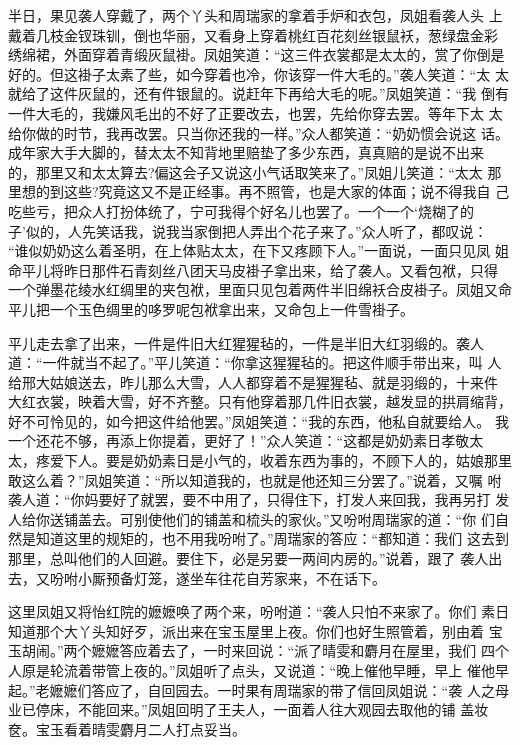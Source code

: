 半日，果见袭人穿戴了，两个丫头和周瑞家的拿着手炉和衣包，凤姐看袭人头
上戴着几枝金钗珠钏，倒也华丽，又看身上穿着桃红百花刻丝银鼠袄，葱绿盘金彩
绣绵裙，外面穿着青缎灰鼠褂。凤姐笑道：“这三件衣裳都是太太的，赏了你倒是
好的。但这褂子太素了些，如今穿着也冷，你该穿一件大毛的。”袭人笑道：“太
太就给了这件灰鼠的，还有件银鼠的。说赶年下再给大毛的呢。”凤姐笑道：“我
倒有一件大毛的，我嫌风毛出的不好了正要改去，也罢，先给你穿去罢。等年下太
太给你做的时节，我再改罢。只当你还我的一样。”众人都笑道：“奶奶惯会说这
话。成年家大手大脚的，替太太不知背地里赔垫了多少东西，真真赔的是说不出来
的，那里又和太太算去?偏这会子又说这小气话取笑来了。”凤姐儿笑道：“太太
那里想的到这些?究竟这又不是正经事。再不照管，也是大家的体面；说不得我自
己吃些亏，把众人打扮体统了，宁可我得个好名儿也罢了。一个一个‘烧糊了的
子’似的，人先笑话我，说我当家倒把人弄出个花子来了。”众人听了，都叹说：
“谁似奶奶这么着圣明，在上体贴太太，在下又疼顾下人。”一面说，一面只见凤
姐命平儿将昨日那件石青刻丝八团天马皮褂子拿出来，给了袭人。又看包袱，只得
一个弹墨花绫水红绸里的夹包袱，里面只见包着两件半旧绵袄合皮褂子。凤姐又命
平儿把一个玉色绸里的哆罗呢包袱拿出来，又命包上一件雪褂子。

平儿走去拿了出来，一件是件旧大红猩猩毡的，一件是半旧大红羽缎的。袭人
道：“一件就当不起了。”平儿笑道：“你拿这猩猩毡的。把这件顺手带出来，叫
人给邢大姑娘送去，昨儿那么大雪，人人都穿着不是猩猩毡、就是羽缎的，十来件
大红衣裳，映着大雪，好不齐整。只有他穿着那几件旧衣裳，越发显的拱肩缩背，
好不可怜见的，如今把这件给他罢。”凤姐笑道：“我的东西，他私自就要给人。
我一个还花不够，再添上你提着，更好了！”众人笑道：“这都是奶奶素日孝敬太
太，疼爱下人。要是奶奶素日是小气的，收着东西为事的，不顾下人的，姑娘那里
敢这么着？”凤姐笑道：“所以知道我的，也就是他还知三分罢了。”说着，又嘱
咐袭人道：“你妈要好了就罢，要不中用了，只得住下，打发人来回我，我再另打
发人给你送铺盖去。可别使他们的铺盖和梳头的家伙。”又吩咐周瑞家的道：“你
们自然是知道这里的规矩的，也不用我吩咐了。”周瑞家的答应：“都知道：我们
这去到那里，总叫他们的人回避。要住下，必是另要一两间内房的。”说着，跟了
袭人出去，又吩咐小厮预备灯笼，遂坐车往花自芳家来，不在话下。

这里凤姐又将怡红院的嬷嬷唤了两个来，吩咐道：“袭人只怕不来家了。你们
素日知道那个大丫头知好歹，派出来在宝玉屋里上夜。你们也好生照管着，别由着
宝玉胡闹。”两个嬷嬷答应着去了，一时来回说：“派了晴雯和麝月在屋里，我们
四个人原是轮流着带管上夜的。”凤姐听了点头，又说道：“晚上催他早睡，早上
催他早起。”老嬷嬷们答应了，自回园去。一时果有周瑞家的带了信回凤姐说：“袭
人之母业已停床，不能回来。”凤姐回明了王夫人，一面着人往大观园去取他的铺
盖妆奁。宝玉看着晴雯麝月二人打点妥当。

